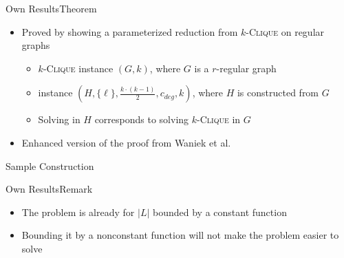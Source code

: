 \begin{frame}{Own Results}{Theorem}
    \begin{center}
    \end{center}

    \begin{itemize}
        \item Proved by showing a parameterized reduction from $k$-\textsc{Clique} on regular graphs
        \begin{itemize}
            \item $k$-\textsc{Clique} instance $(G, k)$, where $G$ is a $r$-regular graph
            \item \HL instance $(H, \{\ell\}, \frac{k\cdot(k-1)}{2}, c_{deg}, k)$, where $H$ is constructed from $G$
            \item Solving \HL in $H$ corresponds to solving $k$-\textsc{Clique} in $G$
        \end{itemize}
        \item Enhanced version of the proof from Waniek et al.
    \end{itemize}
\end{frame}

\begin{frame}{Sample Construction}
    
\end{frame}

\begin{frame}{Own Results}{Remark}
    \begin{center}
    \end{center}

    \begin{itemize}
        \item The problem is \Wh already for $|L|$ bounded by a constant function
        \item Bounding it by a nonconstant function will not make the problem easier to solve
    \end{itemize}
\end{frame}

